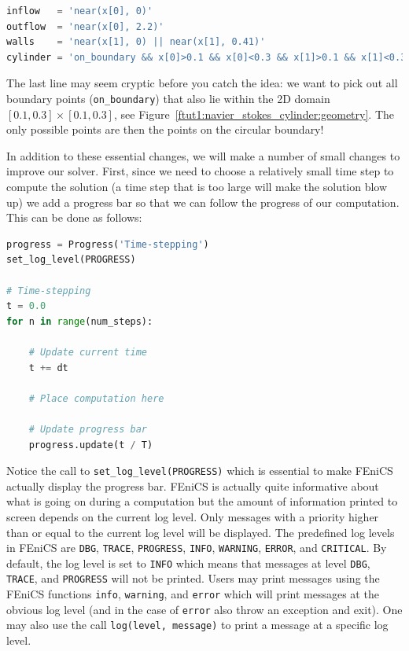 \documentclass[graybox,envcountchap,sectrefs,final]{svmonodo}
\newenvironment{notice_mdfboxadmon}[1][]{
\begin{notice_mdfboxmdframed}[frametitle=#1]
}
{
\end{notice_mdfboxmdframed}
}
\begin{document}
\begin{lstlisting}[language=Python,style=graycolor]
inflow   = 'near(x[0], 0)'
outflow  = 'near(x[0], 2.2)'
walls    = 'near(x[1], 0) || near(x[1], 0.41)'
cylinder = 'on_boundary && x[0]>0.1 && x[0]<0.3 && x[1]>0.1 && x[1]<0.3'
\end{lstlisting}
The last line may seem cryptic before you catch the idea: we want to pick
out all boundary points (\Verb!on_boundary!) that also lie within the 2D
domain $[0.1,0.3]\times [0.1,0.3]$, see Figure~\ref{ftut1:navier_stokes_cylinder:geometry}. The only possible points are then the points on the
circular boundary!


In addition to these essential changes, we will make a number of small
changes to improve our solver. First, since we need to choose a
relatively small time step to compute the solution (a time step that
is too large will make the solution blow up) we add a progress bar so
that we can follow the progress of our computation. This can be done
as follows:


\begin{lstlisting}[language=Python,style=graycolor]
progress = Progress('Time-stepping')
set_log_level(PROGRESS)

# Time-stepping
t = 0.0
for n in range(num_steps):

    # Update current time
    t += dt

    # Place computation here

    # Update progress bar
    progress.update(t / T)
\end{lstlisting}


\begin{notice_mdfboxadmon}
Notice the call to \Verb!set_log_level(PROGRESS)! which is essential to
make FEniCS actually display the progress bar. FEniCS is actually
quite informative about what is going on during a computation but the
amount of information printed to screen depends on the current log
level. Only messages with a priority higher than or equal to the
current log level will be displayed. The predefined log levels in
FEniCS are
\texttt{DBG},
\texttt{TRACE},
\texttt{PROGRESS},
\texttt{INFO},
\texttt{WARNING},
\texttt{ERROR}, and
\texttt{CRITICAL}. By default, the log level is set to \texttt{INFO} which means
that messages at level \texttt{DBG}, \texttt{TRACE}, and \texttt{PROGRESS} will not be
printed. Users may print messages using the FEniCS functions \texttt{info},
\texttt{warning}, and \texttt{error} which will print messages at the obvious log
level (and in the case of \texttt{error} also throw an exception and
exit). One may also use the call \texttt{log(level, message)} to print a
message at a specific log level.
\end{notice_mdfboxadmon} %
\end{document}
